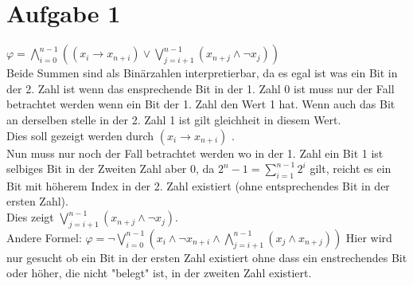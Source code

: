 \section*{Aufgabe 1}


$\varphi = \bigwedge_{i=0}^{n-1}((x_i \rightarrow x_{n+i}) \vee \bigvee_{j=i+1}^{n-1}( x_{n+j} \wedge \neg x_{j}))$ \\



Beide Summen sind als Binärzahlen interpretierbar, da es egal ist was ein Bit in der 2. Zahl ist wenn das ensprechende Bit in der 1. Zahl 0 ist muss nur der Fall betrachtet werden wenn ein Bit der 1. Zahl den Wert 1 hat. Wenn auch das Bit an derselben stelle in der 2. Zahl 1 ist gilt gleichheit in diesem Wert.\\

Dies soll gezeigt werden durch $(x_i \rightarrow x_{n+i})$ .\\


Nun muss nur noch der Fall betrachtet werden wo in der 1. Zahl ein Bit 1 ist selbiges Bit in der Zweiten Zahl aber 0, da $2^n-1 = \sum_{i=1}^{n-1}2^i$ gilt, reicht es ein Bit mit höherem Index in der 2. Zahl  existiert (ohne entsprechendes Bit in der ersten Zahl).\\

Dies zeigt $ \bigvee_{j=i+1}^{n-1}( x_{n+j} \wedge \neg x_{j})$. \\



Andere Formel: $ \varphi = \neg \bigvee_{i=0}^{n-1}(x_i \wedge \neg x_{n+i} \wedge \bigwedge_{j=i+1}^{n-1} (x_j \wedge x_{n+j}))$ 
Hier wird nur gesucht ob ein Bit in der ersten Zahl existiert ohne dass ein enstrechendes Bit oder höher, die nicht "belegt" ist, in der zweiten Zahl existiert.